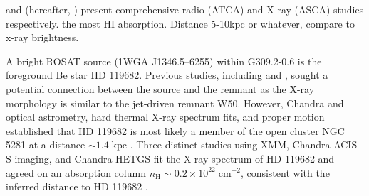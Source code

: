 \documentclass[twocolumn,tighten,trackchanges]{aastex6}
\newcommand*{\mt}{\mathrm}
\newcommand*{\unit}[1]{\;\mt{#1}}  %
\newcommand*{\abt}{\mathord{\sim}} %
\newcommand*{\nH}{n_{\mathrm{H}}}
\begin{document}
and \citet{rakowski01}
(hereafter, \citet{RHS01}) present comprehensive radio (ATCA) and X-ray (ASCA)
studies respectively.
the most HI absorption.
Distance 5-10kpc or whatever, compare to x-ray brightness.


A bright ROSAT source (1WGA J1346.5--6255) within G309.2-0.6 is the foreground
Be star HD 119682.  Previous studies, including \citet{GGM98} and
\citet{RHS01}, sought a potential connection between the source and the
remnant as the X-ray morphology is similar to the jet-driven remnant W50.
However, Chandra and optical astrometry, hard thermal X-ray spectrum fits, and
proper motion established that HD 119682 is most likely a member of the open
cluster NGC 5281 at a distance $\abt 1.4 \unit{kpc}$
\citep{rakowski06, safiharb07}.
Three distinct studies using XMM, Chandra ACIS-S imaging, and Chandra HETGS
fit the X-ray spectrum of HD 119682 and agreed on an absorption column
$\nH \sim 0.2 \times 10^{22} \unit{cm^{-2}}$, consistent with the inferred
distance to HD 119682 \citep{rakowski06, safiharb07, torrejon13}.




\end{document}
